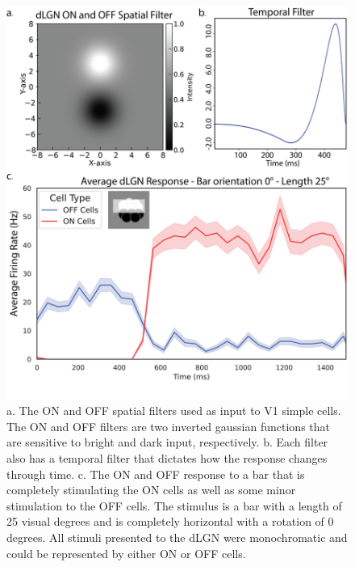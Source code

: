 \documentclass[12pt]{article}
\begin{document}
\begin{figure}[H]
  \centering
  \includegraphics[width=1.0 \textwidth]{figures/lgn_response_fig.png}
  \caption{a. The ON and OFF spatial filters used as input to V1 simple cells. The ON and OFF filters are two inverted gaussian functions that are sensitive to bright and dark input, respectively. b. Each filter also has a temporal filter that dictates how the response changes through time. c. The ON and OFF response to a bar that is completely stimulating the ON cells as well as some minor stimulation to the OFF cells. The stimulus is a bar with a length of 25 visual degrees and is completely horizontal with a rotation of 0 degrees. All stimuli presented to the dLGN were monochromatic and could be represented by either ON or OFF cells.}
  \label{fig:LIF_connectivity}
\end{figure}
\end{document}
